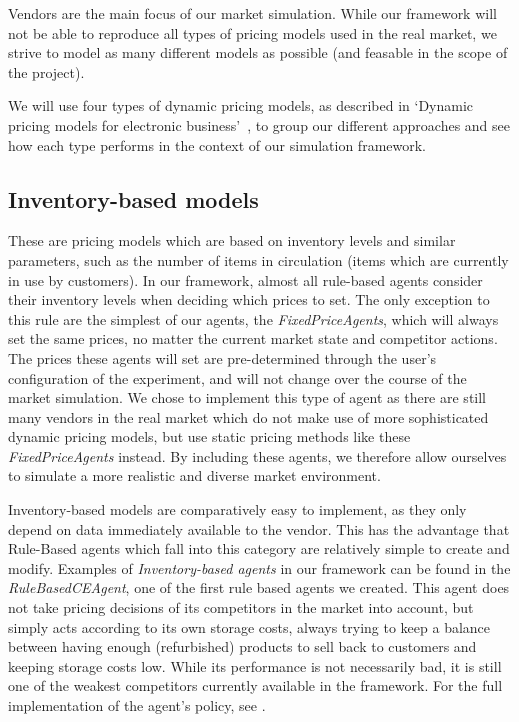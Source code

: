 Vendors are the main focus of our market simulation. While our framework will not be able to reproduce all types of pricing models used in the real market, we strive to model as many different models as possible (and feasable in the scope of the project).

We will use four types of dynamic pricing models, as described in `Dynamic pricing models for electronic business'~\cite{dynamicPricingModels}, to group our different approaches and see how each type performs in the context of our simulation framework.

\subsection*{Inventory-based models}

These are pricing models which are based on inventory levels and similar parameters, such as the number of items in circulation (items which are currently in use by customers). In our framework, almost all rule-based agents consider their inventory levels when deciding which prices to set. The only exception to this rule are the simplest of our agents, the \emph{FixedPriceAgents}, which will always set the same prices, no matter the current market state and competitor actions. The prices these agents will set are pre-determined through the user's configuration of the experiment, and will not change over the course of the market simulation. We chose to implement this type of agent as there are still many vendors in the real market which do not make use of more sophisticated dynamic pricing models, but use static pricing methods like these \emph{FixedPriceAgents} instead. By including these agents, we therefore allow ourselves to simulate a more realistic and diverse market environment.

Inventory-based models are comparatively easy to implement, as they only depend on data immediately available to the vendor. This has the advantage that Rule-Based agents which fall into this category are relatively simple to create and modify. Examples of \emph{Inventory-based agents} in our framework can be found in the \emph{RuleBasedCEAgent}, one of the first rule based agents we created. This agent does not take pricing decisions of its competitors in the market into account, but simply acts according to its own storage costs, always trying to keep a balance between having enough (refurbished) products to sell back to customers and keeping storage costs low. While its performance is not necessarily bad, it is still one of the weakest competitors currently available in the framework. For the full implementation of the agent's policy, see .

